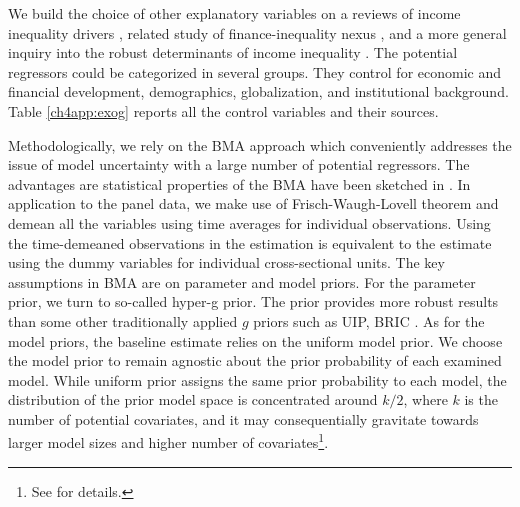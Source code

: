 \documentclass[preprint, nonatbib, 10pt]{elsarticle}
\begin{document}
We build the choice of other explanatory variables on a reviews of income inequality drivers \parencite{roineetal2009,nolan2019drivers}, related study of finance-inequality nexus \parencite{de2017finance}, and a more general inquiry into the robust determinants of income inequality \parencite{furceri2019robust}. The potential regressors could be categorized in several groups. They control for economic and financial development, demographics, globalization, and institutional background. Table \ref{ch4app:exog} reports all the control variables and their sources. 

%
%
Methodologically, we rely on the \ac{BMA} approach which conveniently addresses the issue of model uncertainty with a large number of potential regressors. The advantages are statistical properties of the \ac{BMA} have been sketched in \textcite{Koop2003}. In application to the panel data, we make use of Frisch-Waugh-Lovell theorem and demean all the variables using time averages for individual observations. Using the time-demeaned observations in the estimation is equivalent to the estimate using the dummy variables for individual cross-sectional units. The key assumptions in \ac{BMA} are on parameter and model priors. For the parameter prior, we turn to so-called hyper-g prior. The prior provides more robust results than some other traditionally applied $g$ priors such as \ac{UIP}, \ac{BRIC} \parencite{feldkircher2012impact}. As for the model priors, the baseline estimate relies on the uniform model prior. We choose the model prior to remain agnostic about the prior probability of each examined model. While uniform prior assigns the same prior probability to each model, the distribution of the prior model space is concentrated around $k/2$, where $k$ is the number of potential covariates, and it may consequentially gravitate towards larger model sizes and higher number of covariates\footnote{See \textcite{LeySteel2009} for details.}.
\end{document}
